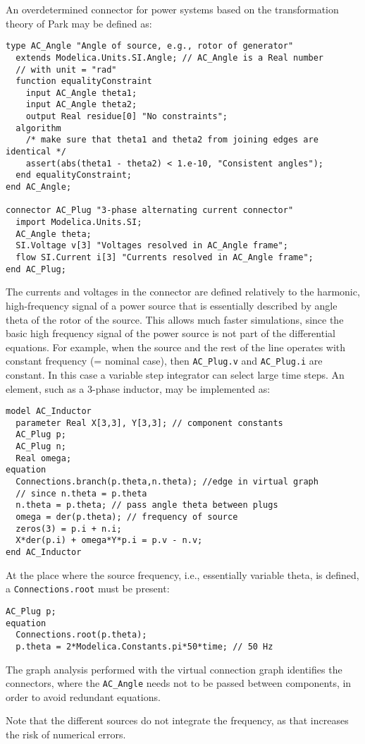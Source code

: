 \begin{nonnormative}
An overdetermined connector for power systems based on the transformation theory of Park may be defined as:
\begin{lstlisting}[language=modelica]
type AC_Angle "Angle of source, e.g., rotor of generator"
  extends Modelica.Units.SI.Angle; // AC_Angle is a Real number
  // with unit = "rad"
  function equalityConstraint
    input AC_Angle theta1;
    input AC_Angle theta2;
    output Real residue[0] "No constraints";
  algorithm
    /* make sure that theta1 and theta2 from joining edges are identical */
    assert(abs(theta1 - theta2) < 1.e-10, "Consistent angles");
  end equalityConstraint;
end AC_Angle;

connector AC_Plug "3-phase alternating current connector"
  import Modelica.Units.SI;
  AC_Angle theta;
  SI.Voltage v[3] "Voltages resolved in AC_Angle frame";
  flow SI.Current i[3] "Currents resolved in AC_Angle frame";
end AC_Plug;
\end{lstlisting}
The currents and voltages in the connector are defined relatively to the harmonic, high-frequency signal of a power source that is essentially described by angle theta of the rotor of the source.
This allows much faster simulations, since the basic high frequency signal of the power source is not part of the differential equations.
For example, when the source and the rest of the line operates with constant frequency (= nominal case), then \lstinline!AC_Plug.v! and \lstinline!AC_Plug.i! are constant.
In this case a variable step integrator can select large time steps.
An element, such as a 3-phase inductor, may be implemented as:
\begin{lstlisting}[language=modelica]
model AC_Inductor
  parameter Real X[3,3], Y[3,3]; // component constants
  AC_Plug p;
  AC_Plug n;
  Real omega;
equation
  Connections.branch(p.theta,n.theta); //edge in virtual graph
  // since n.theta = p.theta
  n.theta = p.theta; // pass angle theta between plugs
  omega = der(p.theta); // frequency of source
  zeros(3) = p.i + n.i;
  X*der(p.i) + omega*Y*p.i = p.v - n.v;
end AC_Inductor
\end{lstlisting}
At the place where the source frequency, i.e., essentially variable theta, is defined, a \lstinline!Connections.root! must be present:
\begin{lstlisting}[language=modelica]
  AC_Plug p;
equation
  Connections.root(p.theta);
  p.theta = 2*Modelica.Constants.pi*50*time; // 50 Hz
\end{lstlisting}
The graph analysis performed with the virtual connection graph identifies the connectors, where the \lstinline!AC_Angle! needs not to be passed between components, in order to avoid redundant equations.

Note that the different sources do not integrate the frequency, as that increases the risk of numerical errors.
\end{nonnormative}

